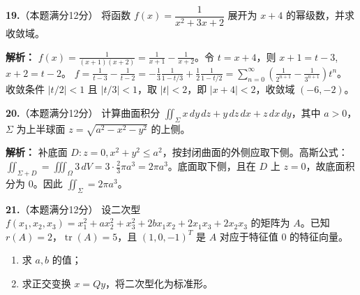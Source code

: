 \vspace{8pt}

\textbf{19.}（本题满分12分）
将函数 $f(x) = \dfrac{1}{x^2+3x+2}$ 展开为 $x+4$ 的幂级数，并求收敛域。

\ifshowsolutions\par\noindent\textbf{解析：} $f(x)=\frac{1}{(x+1)(x+2)} = \frac{1}{x+1} - \frac{1}{x+2}$。令 $t=x+4$，则 $x+1=t-3$, $x+2=t-2$。
$f = \frac{1}{t-3} - \frac{1}{t-2} = -\frac{1}{3}\frac{1}{1-t/3} + \frac{1}{2}\frac{1}{1-t/2} = \sum_{n=0}^{\infty}\left(\frac{1}{2^{n+1}} - \frac{1}{3^{n+1}}\right)t^n$。
收敛条件 $|t/2|<1$ 且 $|t/3|<1$，取 $|t|<2$，即 $|x+4|<2$，收敛域 $(-6,-2)$。
\else \answerarea[8] \fi

\vspace{8pt}

\textbf{20.}（本题满分12分）
计算曲面积分 $\displaystyle\iint_{\Sigma} x\,dy\,dz + y\,dz\,dx + z\,dx\,dy$，其中 $a>0$，$\Sigma$ 为上半球面 $z=\sqrt{a^2-x^2-y^2}$ 的上侧。

\ifshowsolutions\par\noindent\textbf{解析：} 补底面 $D: z=0, x^2+y^2\leqslant a^2$，按封闭曲面的外侧应取下侧。高斯公式：
$\iint_{\Sigma+D} = \iiint_{\Omega} 3\,dV = 3\cdot\frac{2}{3}\pi a^3 = 2\pi a^3$。底面取下侧，且在 $D$ 上 $z=0$，故底面积分为 $0$。因此 $\iint_{\Sigma} = 2\pi a^3$。
\else \answerarea[8] \fi

\vspace{8pt}

\textbf{21.}（本题满分12分）
设二次型 $f(x_1,x_2,x_3) = x_1^2 + ax_2^2 + x_3^2 + 2bx_1x_2 + 2x_1x_3 + 2x_2x_3$ 的矩阵为 $A$。已知 $r(A)=2$，$\operatorname{tr}(A)=5$，且 $(1,0,-1)^T$ 是 $A$ 对应于特征值 $0$ 的特征向量。
\begin{enumerate}
    \item[(1)] 求 $a,b$ 的值；
    \item[(2)] 求正交变换 $x=Qy$，将二次型化为标准形。
\end{enumerate}

